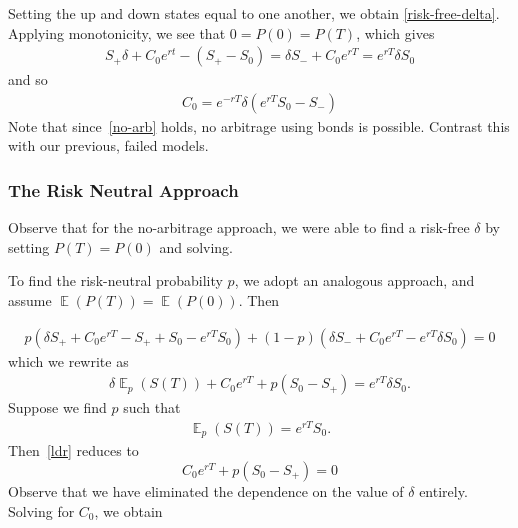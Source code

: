 \documentclass[12pt]{article}
\DeclareMathOperator{\ex}{\mathbb{E}}
\theoremstyle{plain}
\theoremstyle{definition}
\theoremstyle{remark}
\numberwithin{equation}{section}  %
\begin{document}
Setting the up and down states equal to one another, we obtain
\eqref{risk-free-delta}. Applying monotonicity, we see that
$0 = P(0) = P(T)$, which gives
\begin{equation}\label{no-arb}
\begin{split}
S_{+} \delta + C_{0}e^{rt} - (S_{+} - S_{0})
 = 	\delta S_{-} + C_{0} e^{rT} = e^{rT} \delta S_{0} 
\end{split}
\end{equation}
and so
\begin{equation}
\begin{split}
	C_{0} = e^{-rT}\delta(e^{rT} S_{0} - S_{-})
\end{split}
\end{equation}
Note that since~\eqref{no-arb} holds, no arbitrage using bonds is
possible. Contrast this with our previous, failed models. 
\subsubsection{The Risk Neutral Approach}
Observe that for the no-arbitrage approach, we were able to find a risk-free
$\delta$ by setting $P(T) = P(0)$ and solving.

To find the risk-neutral probability $p$, we adopt an analogous approach,
and assume $\ex(P(T)) = \ex(P(0))$. Then

\begin{equation*}
\begin{split}
	p(\delta S_{+} + C_{0} e^{rT} - S_{+} + S_{0} - e^{rT}S_{0})
	+ (1-p)(\delta S_{-} + C_{0} e^{rT} - e^{rT} \delta S_{0}) = 0
\end{split}
\end{equation*}
which we rewrite as
\begin{equation}
	\label{ldr}
\begin{split}
	\delta \ex_{p}(S(T)) + C_{0} e^{rT} + p(S_{0} - S_{+}) = e^{rT} \delta
	S_{0}.
\end{split}
\end{equation}
Suppose we find $p$ such that 
\begin{equation}\label{fpp}
\begin{split}
	\ex_{p}(S(T)) = e^{rT} S_{0}.
\end{split}
\end{equation}
Then~\eqref{ldr} reduces to
\begin{equation*}
	 C_{0} e^{rT} + p(S_{0} - S_{+}) = 0 
\end{equation*}
Observe that we have eliminated the dependence on the value of $\delta$
entirely. Solving for $C_{0}$, we obtain
\end{document}
